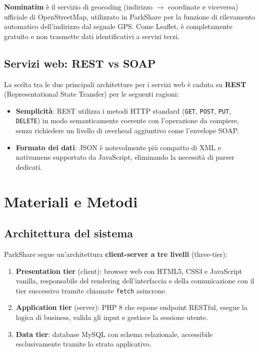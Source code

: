 \documentclass[12pt, a4paper]{article}
\begin{document}
\textbf{Nominatim} è il servizio di geocoding (indirizzo $\to$ coordinate e viceversa)
ufficiale di OpenStreetMap, utilizzato in ParkShare per la funzione di rilevamento
automatico dell'indirizzo dal segnale GPS. Come Leaflet, è completamente gratuito
e non trasmette dati identificativi a servizi terzi.

\subsection{Servizi web: REST vs SOAP}

La scelta tra le due principali architetture per i servizi web è caduta su
\textbf{REST} (Representational State Transfer) per le seguenti ragioni:

\begin{itemize}
    \item \textbf{Semplicità}: REST utilizza i metodi HTTP standard
    (\texttt{GET}, \texttt{POST}, \texttt{PUT}, \texttt{DELETE}) in modo semanticamente
    coerente con l'operazione da compiere, senza richiedere un livello di overhead
    aggiuntivo come l'envelope SOAP.

    \item \textbf{Formato dei dati}: JSON è notevolmente più compatto di XML e nativamene
    supportato da JavaScript, eliminando la necessità di parser dedicati.
\end{itemize}

\section{Materiali e Metodi}
\label{sec:metodi}

\subsection{Architettura del sistema}

ParkShare segue un'architettura \textbf{client-server a tre livelli} (three-tier):

\begin{enumerate}
    \item \textbf{Presentation tier} (client): browser web con HTML5, CSS3 e JavaScript
    vanilla, responsabile del rendering dell'interfaccia e della comunicazione con il tier
    successivo tramite chiamate \texttt{fetch} asincrone.

    \item \textbf{Application tier} (server): PHP 8 che espone endpoint RESTful, esegue
    la logica di business, valida gli input e gestisce la sessione utente.

    \item \textbf{Data tier}: database MySQL con schema relazionale, accessibile
    esclusivamente tramite lo strato applicativo.
\end{enumerate}
\end{document}
